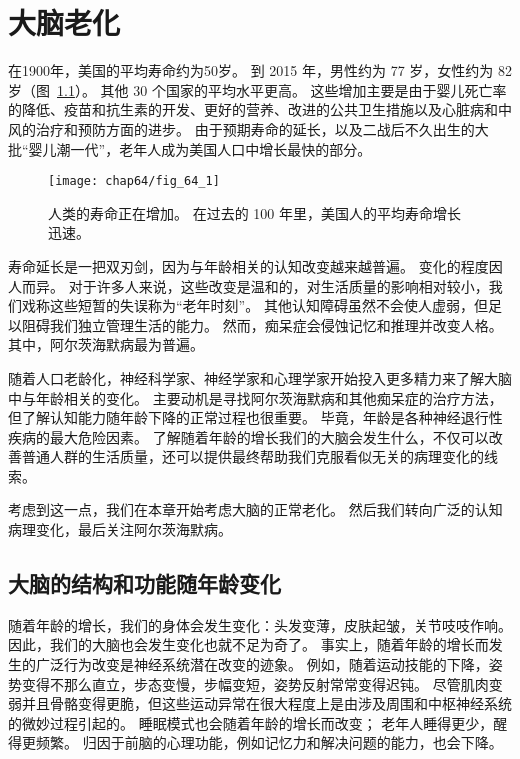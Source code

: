 \chapter{大脑老化} \label{chap:chap64}

在1900年，美国的平均寿命约为50岁。
到 2015 年，男性约为 77 岁，女性约为 82 岁（图~\ref{fig:64_1}）。
其他 30 个国家的平均水平更高。
这些增加主要是由于婴儿死亡率的降低、疫苗和抗生素的开发、更好的营养、改进的公共卫生措施以及心脏病和中风的治疗和预防方面的进步。
由于预期寿命的延长，以及二战后不久出生的大批“婴儿潮一代”，老年人成为美国人口中增长最快的部分。


\begin{figure}[htbp]
	\centering
	\texttt{[image: chap64/fig\_64\_1]}
	\caption{人类的寿命正在增加。
		在过去的 100 年里，美国人的平均寿命增长迅速\cite{strehler1975implications,arias2007united}。}
	\label{fig:64_1}
\end{figure}


寿命延长是一把双刃剑，因为与年龄相关的认知改变越来越普遍。
变化的程度因人而异。
对于许多人来说，这些改变是温和的，对生活质量的影响相对较小，我们戏称这些短暂的失误称为“老年时刻”。
其他认知障碍虽然不会使人虚弱，但足以阻碍我们独立管理生活的能力。
然而，痴呆症会侵蚀记忆和推理并改变人格。
其中，阿尔茨海默病最为普遍。


随着人口老龄化，神经科学家、神经学家和心理学家开始投入更多精力来了解大脑中与年龄相关的变化。
主要动机是寻找阿尔茨海默病和其他痴呆症的治疗方法，但了解认知能力随年龄下降的正常过程也很重要。
毕竟，年龄是各种神经退行性疾病的最大危险因素。
了解随着年龄的增长我们的大脑会发生什么，不仅可以改善普通人群的生活质量，还可以提供最终帮助我们克服看似无关的病理变化的线索。


考虑到这一点，我们在本章开始考虑大脑的正常老化。
然后我们转向广泛的认知病理变化，最后关注阿尔茨海默病。



\section{大脑的结构和功能随年龄变化}

随着年龄的增长，我们的身体会发生变化：头发变薄，皮肤起皱，关节吱吱作响。
因此，我们的大脑也会发生变化也就不足为奇了。
事实上，随着年龄的增长而发生的广泛行为改变是神经系统潜在改变的迹象。
例如，随着运动技能的下降，姿势变得不那么直立，步态变慢，步幅变短，姿势反射常常变得迟钝。
尽管肌肉变弱并且骨骼变得更脆，但这些运动异常在很大程度上是由涉及周围和中枢神经系统的微妙过程引起的。
睡眠模式也会随着年龄的增长而改变；
老年人睡得更少，醒得更频繁。
归因于前脑的心理功能，例如记忆力和解决问题的能力，也会下降。


